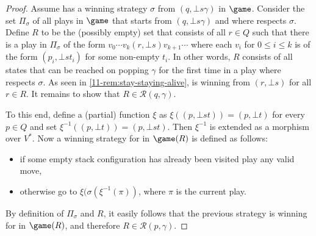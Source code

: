 \begin{proof}
Assume \Eve has a winning strategy $\sigma$ from $(q,\bot s\gamma)$ in $\game$. Consider the set $\Pi_\sigma$ of all plays in $\game$ that starts from $(q,\bot s\gamma)$ and where \Eve respects $\sigma$. Define $R$ to be the (possibly empty) set that consists of all $r\in Q$ such that there is a play in $\Pi_\sigma$ of the form $v_0\cdots v_k (r,\bot s) v_{k+1}\cdots$ where each $v_i$ for $0\leq i\leq k$ is of the form $(p_i,\bot s t_i)$ for some non-empty $t_i$. In other words, $R$ consists of all states that can be reached on popping $\gamma$ for the first time in a play where \Eve respects $\sigma$. As seen in \cref{11-rem:stay-staying-alive}, \Eve is winning from $(r,\bot s)$ for all $r \in R$. It remains to show that $R\in\mathcal{R}(q,\gamma)$.

To this end, define a (partial) function $\xi$ as $\xi((p,\bot s t))=(p,\bot t)$ for every $p\in Q$ and set $\xi^{-1}((p,\bot t))=(p,\bot s t)$. Then $\xi^{-1}$ is extended as a morphism over $V^*$.  Now a winning strategy for \Eve in $\game(R)$ is defined as follows:
\begin{itemize}
\item if some empty stack configuration has already been visited play any valid move, 
\item otherwise go to $\xi(\sigma(\xi^{-1}(\pi))$, where $\pi$ is the current play.
\end{itemize}
By definition of $\Pi_\sigma$ and $R$, it easily follows that the previous strategy is winning for \Eve in $\game(R)$, and therefore $R\in\mathcal{R}(p,\gamma)$. 


\end{proof}
